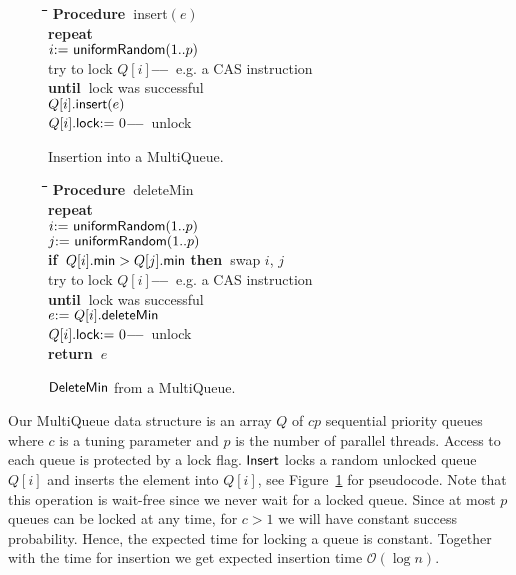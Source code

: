 \documentclass[a4paper,12pt]{article}
\newcommand{\Id}[1]{\ensuremath{\text{{\sf #1}}}}
\newcommand{\Oh}[1]{\mathcal{O}\!\left( #1\right)}
\newenvironment{code}{\noindent\normalsize \begin{tabbing}\hspace{2em}\=\hspace{2em}\=\hspace{2em}\=\hspace{2em}\=\hspace{2em}\=\hspace{2em}\=\hspace{2em}\=\hspace{2em}\=\hspace{2em}\=\hspace{2em}\=\kill}{\end{tabbing}}
\newcommand{\Procedure}{{\bf Procedure\ }}
\newcommand{\Repeat}   {{\bf repeat\ }}
\newcommand{\Until}    {{\bf until\ }}
\newcommand{\Is}{\mbox{\rm := }}
\newcommand{\If}       {{\bf if\ }}
\newcommand{\Then}     {{\bf then\ }}
\newcommand{\Return}   {{\bf return\ }}
\newcommand{\RRem}[1]   {\`{\bf --\hspace{0.5mm}--~}{\rm#1}}
\begin{document}
\begin{figure}[b]
\begin{code}
\Procedure insert$(e)$\+\\
  \Repeat\+\\
    $i\Is \Id{uniformRandom}(1..p)$\\
    try to lock $Q[i]$\RRem{e.g. a CAS instruction}\-\\
  \Until lock was successful\\
  $Q[i].\Id{insert}(e)$\\
  $Q[i].\Id{lock}\Is 0$\RRem{unlock}\\
\end{code}
\caption{\label{alg:insertMQ}Insertion into a MultiQueue.}
\end{figure}
\begin{figure}[t]
\begin{code}
\Procedure deleteMin\+\\
  \Repeat\+\\
    $i\Is \Id{uniformRandom}(1..p)$\\
    $j\Is \Id{uniformRandom}(1..p)$\\
    \If $Q[i].\Id{min}>Q[j].\Id{min}$ \Then swap $i$, $j$\\
    try to lock $Q[i]$\RRem{e.g. a CAS instruction}\-\\
  \Until lock was successful\\
  $e\Is Q[i].\Id{deleteMin}$\\
  $Q[i].\Id{lock}\Is 0$\RRem{unlock}\\
  \Return $e$
\end{code}
\caption{\label{alg:deleteMinMQ}\Id{DeleteMin} from a MultiQueue.}
\end{figure}


Our MultiQueue data structure is an array $Q$ of $cp$ sequential priority queues where $c$ is a tuning parameter and $p$ is the number of parallel threads. Access to each queue is protected by a lock flag. \Id{Insert} locks a random unlocked queue $Q[i]$ and inserts the element into $Q[i]$, see Figure~\ref{alg:insertMQ} for pseudocode. Note that this operation is wait-free since we never wait for a locked queue. Since at most $p$ queues can be locked at any time, for $c>1$ we will have constant success probability. Hence, the expected time for locking a queue is constant. Together with the time for insertion we get expected insertion time $\Oh{\log n}$.
\end{document}
